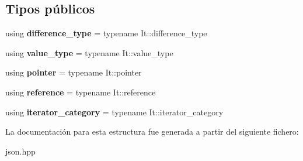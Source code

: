 \subsection*{Tipos públicos}
\begin{DoxyCompactItemize}
\item 
\mbox{\label{structnlohmann_1_1detail_1_1iterator__types_3_01It_00_01void__t_3_01typename_01It_1_1difference_d2be8685966c97e00e99d4fd2366dc0b_a1ce16c1c8c1d6a195f5a3d3ad31820f0}} 
using {\bfseries difference\+\_\+type} = typename It\+::difference\+\_\+type
\item 
\mbox{\label{structnlohmann_1_1detail_1_1iterator__types_3_01It_00_01void__t_3_01typename_01It_1_1difference_d2be8685966c97e00e99d4fd2366dc0b_ac70fcab4cacd8b386c3f2b056885e15e}} 
using {\bfseries value\+\_\+type} = typename It\+::value\+\_\+type
\item 
\mbox{\label{structnlohmann_1_1detail_1_1iterator__types_3_01It_00_01void__t_3_01typename_01It_1_1difference_d2be8685966c97e00e99d4fd2366dc0b_aacaf73dc959b7c2119c15e53b5ce00a3}} 
using {\bfseries pointer} = typename It\+::pointer
\item 
\mbox{\label{structnlohmann_1_1detail_1_1iterator__types_3_01It_00_01void__t_3_01typename_01It_1_1difference_d2be8685966c97e00e99d4fd2366dc0b_a5e82d2d8dabd022b8ff916f2e83a82f2}} 
using {\bfseries reference} = typename It\+::reference
\item 
\mbox{\label{structnlohmann_1_1detail_1_1iterator__types_3_01It_00_01void__t_3_01typename_01It_1_1difference_d2be8685966c97e00e99d4fd2366dc0b_aaaafbcd0573ec9cfc5d19411950dc1ac}} 
using {\bfseries iterator\+\_\+category} = typename It\+::iterator\+\_\+category
\end{DoxyCompactItemize}


La documentación para esta estructura fue generada a partir del siguiente fichero\+:\begin{DoxyCompactItemize}
\item 
json.\+hpp\end{DoxyCompactItemize}
